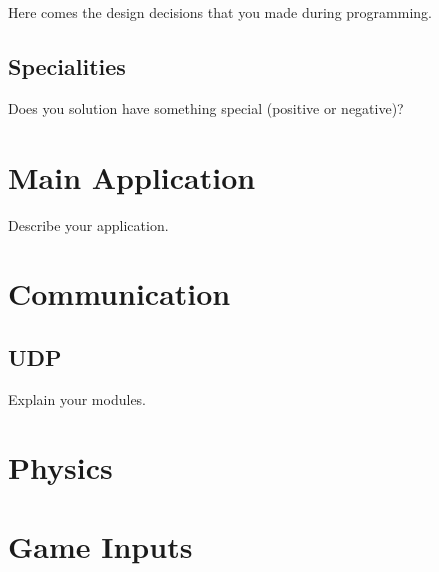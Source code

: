 \documentclass[12pt,a4paper,titlepage,oneside]{article}
\begin{document}
Here comes the design decisions that you made during programming.

\subsection{Specialities}

Does you solution have something special (positive or negative)?


\section{Main Application}

Describe your application.


\section{Communication}

\subsection{UDP}

Explain your modules.

\section{Physics}

\section{Game Inputs}
\end{document}

